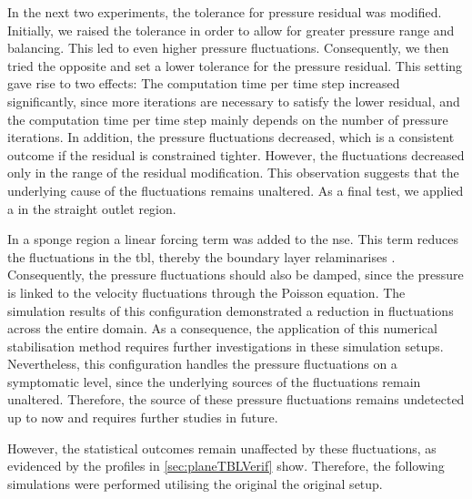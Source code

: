 In the next two experiments, the tolerance for pressure residual was modified.
Initially, we raised the tolerance in order to allow for  greater  pressure  range and balancing. 
This led to even higher pressure fluctuations. Consequently, we then tried the opposite and set a lower tolerance for the pressure residual.
This setting gave rise to two effects:
The computation time per time step increased significantly, since more iterations are necessary to satisfy the lower residual, and the computation time per time step  mainly depends on the number of pressure iterations.
In addition, the pressure fluctuations decreased, which is a consistent outcome if the residual is constrained tighter.
However, the fluctuations decreased only in the range of the residual modification. This observation suggests that the underlying cause of the fluctuations remains unaltered.
As a final test, we applied a  in the straight outlet region. 


In a sponge region a linear forcing term was added to the \acrshort{nse}.
This term reduces the fluctuations in the \acrshort{tbl}, thereby the boundary layer relaminarises \citep{schlatter_turbulent_2012}.
Consequently, the pressure fluctuations should also be damped, since the pressure is linked to the velocity fluctuations through the Poisson equation.
The simulation results of this configuration demonstrated a reduction in fluctuations across the entire domain.
As a consequence, the application of this numerical stabilisation method requires further investigations in these simulation setups.
Nevertheless, this configuration handles the pressure fluctuations on a symptomatic level, since the underlying sources of the fluctuations remain unaltered.
Therefore, the source of these pressure fluctuations remains undetected up to now and requires further studies in future. 

However, the statistical outcomes remain unaffected by these fluctuations, as evidenced by the profiles  in \autoref{sec:planeTBLVerif} show.
Therefore, the following simulations were performed  utilising the original the original setup.


